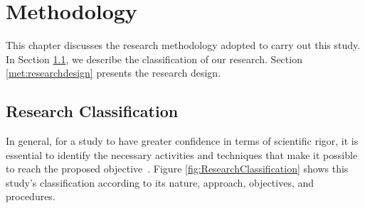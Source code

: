 \chapter{Methodology}\label{chap:methodology}

This chapter discusses the research methodology adopted to carry out this study.
In Section \ref{met:researchClassification}, we describe the classification of our research.
Section \ref{met:researchdesign} presents the research design.

\section{Research Classification}\label{met:researchClassification}

In general, for a study to have greater confidence in terms of scientific rigor, it is essential to identify the necessary activities and techniques that make it possible to reach the proposed objective~\cite{Peffers:2007, Vinayak:2019}.
Figure \ref{fig:ResearchClassification} shows this study's classification according to its nature, approach, objectives, and procedures.

